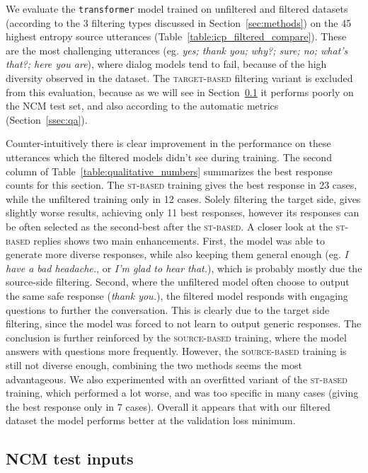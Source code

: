 \documentclass[11pt,a4paper]{article}
\begin{document}
We evaluate the \texttt{transformer} model trained on unfiltered and filtered datasets (according to the 3 filtering types discussed in Section~\ref{sec:methods}) on the 45 highest entropy source utterances (Table~\ref{table:icp_filtered_compare}). These are the most challenging utterances (eg. \textit{yes; thank you; why?; sure; no; what's that?; here you are}), where dialog models tend to fail, because of the high diversity observed in the dataset. The \textsc{target-based} filtering variant is excluded from this evaluation, because as we will see in Section~\ref{ssec:ncm_test_inputs} it performs poorly on the NCM test set, and also according to the automatic metrics (Section~\ref{ssec:qa}).

Counter-intuitively there is clear improvement in the performance on these utterances which the filtered models didn't see during training. The second column of Table~\ref{table:qualitative_numbers} summarizes the best response counts for this section.
The \textsc{st-based} training gives the best response in 23 cases, while the unfiltered training only in 12 cases. Solely filtering the target side, gives slightly worse results, achieving only 11 best responses, however its responses can be often selected as the second-best after the \textsc{st-based}. A closer look at the \textsc{st-based} replies shows two main enhancements. First, the model was able to generate more diverse
responses, while also keeping them general enough (eg. \textit{I have a bad
	headache.}, or \textit{I'm glad to hear that.}), which is probably mostly due
the source-side filtering. Second, where the unfiltered model often choose to
output the same safe response (\textit{thank you.}), the
filtered model responds with engaging questions to
further the conversation. This is clearly due to the target side filtering,
since the model was forced to not learn to output generic responses. The conclusion is further reinforced by the \textsc{source-based} training, where the model answers with questions more frequently. However, the \textsc{source-based} training is still not diverse enough, combining the two methods seems the most advantageous. We also experimented with an overfitted variant of the \textsc{st-based} training, which performed a lot worse, and was too specific in many cases (giving the best response only in 7 cases). Overall it appears that with our filtered dataset the model performs better at the validation loss minimum.

\subsection{NCM test inputs}
\label{ssec:ncm_test_inputs}
\end{document}
